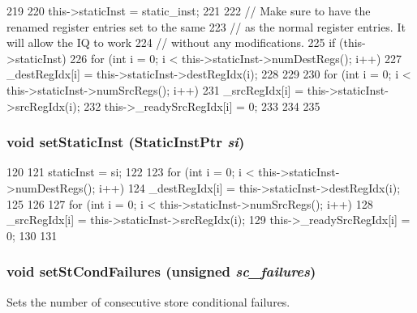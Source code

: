 \begin{DoxyCode}
219 {
220     this->staticInst = static_inst;
221 
222     // Make sure to have the renamed register entries set to the same
223     // as the normal register entries.  It will allow the IQ to work
224     // without any modifications.
225     if (this->staticInst) {
226         for (int i = 0; i < this->staticInst->numDestRegs(); i++) {
227             _destRegIdx[i] = this->staticInst->destRegIdx(i);
228         }
229 
230         for (int i = 0; i < this->staticInst->numSrcRegs(); i++) {
231             _srcRegIdx[i] = this->staticInst->srcRegIdx(i);
232             this->_readySrcRegIdx[i] = 0;
233         }
234     }
235 }
\end{DoxyCode}
\hypertarget{classInOrderDynInst_add5f0a42aa245dbea8868a9d869fceac}{
\subsubsection[{setStaticInst}]{\setlength{\rightskip}{0pt plus 5cm}void setStaticInst ({\bf StaticInstPtr} {\em si})}}
\label{classInOrderDynInst_add5f0a42aa245dbea8868a9d869fceac}



\begin{DoxyCode}
120 {
121     staticInst = si;
122 
123     for (int i = 0; i < this->staticInst->numDestRegs(); i++) {
124         _destRegIdx[i] = this->staticInst->destRegIdx(i);
125     }
126 
127     for (int i = 0; i < this->staticInst->numSrcRegs(); i++) {
128         _srcRegIdx[i] = this->staticInst->srcRegIdx(i);
129         this->_readySrcRegIdx[i] = 0;
130     }
131 }
\end{DoxyCode}
\hypertarget{classInOrderDynInst_abbe779fa43c72cd485ddb736ab17ff61}{
\subsubsection[{setStCondFailures}]{\setlength{\rightskip}{0pt plus 5cm}void setStCondFailures (unsigned {\em sc\_\-failures})}}
\label{classInOrderDynInst_abbe779fa43c72cd485ddb736ab17ff61}
Sets the number of consecutive store conditional failures. 


